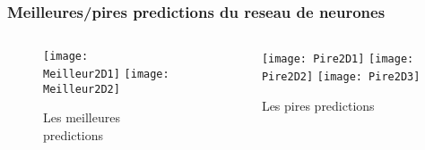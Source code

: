 \begin{frame}[fragile]
    \frametitle{Meilleures/pires predictions du reseau de neurones}

    \begin{columns}
    \begin{column}{0.5\textwidth}
        \begin{figure}
        \texttt{[image: Meilleur2D1]}       
        \texttt{[image: Meilleur2D2]}       
        \caption{Les meilleures predictions}
        \end{figure}
     \end{column}
     \begin{column}{0.5\textwidth}
        \begin{figure}
        \texttt{[image: Pire2D1]}       
        \texttt{[image: Pire2D2]}       
        \texttt{[image: Pire2D3]}       
        \caption{Les pires predictions}
        \end{figure}
     \end{column}
    \end{columns}

\end{frame}

